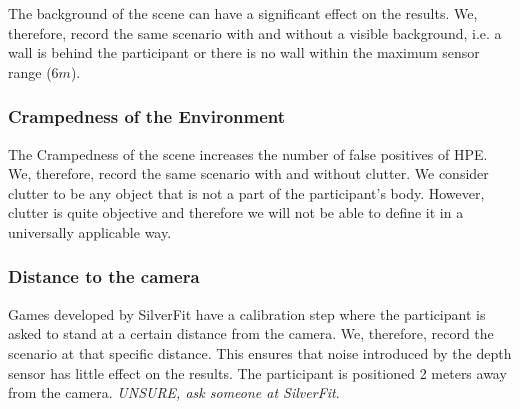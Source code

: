 The background of the scene can have a significant effect on the results. We, therefore, record the same scenario with and without a visible background, i.e. a wall is behind the participant or there is no wall within the maximum sensor range ($6m$).

\subsubsection{Crampedness of the Environment}

The Crampedness of the scene increases the number of false positives of HPE. We, therefore, record the same scenario with and without clutter. We consider clutter to be any object that is not a part of the participant's body. However, clutter is quite objective and therefore we will not be able to define it in a universally applicable way. 

\subsubsection{Distance to the camera}

Games developed by SilverFit have a calibration step where the participant is asked to stand at a certain distance from the camera. We, therefore, record the scenario at that specific distance. This ensures that noise introduced by the depth sensor has little effect on the results. The participant is positioned 2 meters away from the camera. \textit{UNSURE, ask someone at SilverFit}.



